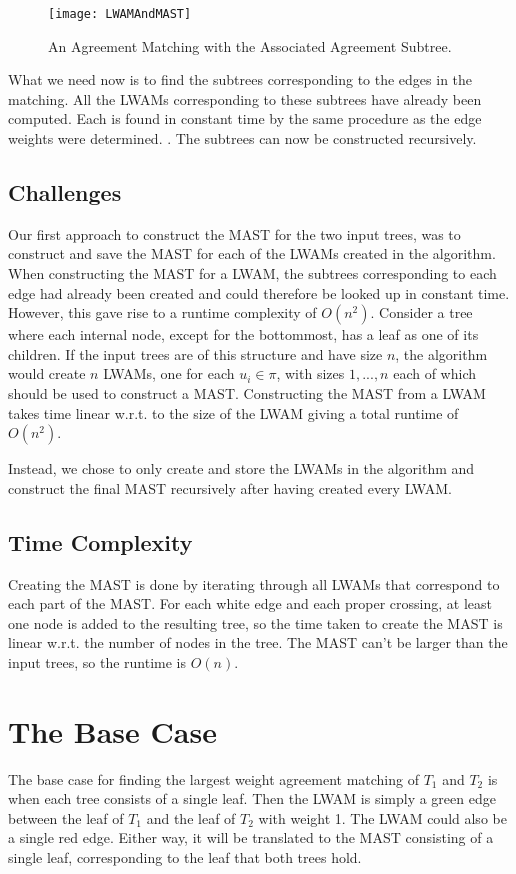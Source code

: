 \begin{figure}
	\texttt{[image: LWAMAndMAST]}
	\caption{An Agreement Matching with the Associated Agreement Subtree. \cite{nlogn}}
	\label{lwam_mast_figure}
\end{figure}

What we need now is to find the subtrees corresponding to the edges in the matching. All the LWAMs corresponding to these subtrees have already been computed. Each is found in constant time by the same procedure as the edge weights were determined.  . The subtrees can now be constructed recursively.

\subsection{Challenges} 
Our first approach to construct the MAST for the two input trees, was to construct and save the MAST for each of the LWAMs created in the algorithm. When constructing the MAST for a LWAM, the subtrees corresponding to each edge had already been created and could therefore be looked up in constant time. However, this gave rise to a runtime complexity of $O(n^2)$. Consider a tree where each internal node, except for the bottommost, has a leaf as one of its children. If the input trees are of this structure and have size $n$, the algorithm would create $n$ LWAMs, one for each $u_i \in \pi$, with sizes $1, ..., n$ each of which should be used to construct a MAST. Constructing the MAST from a LWAM takes time linear w.r.t. to the size of the LWAM giving a total runtime of $O(n^2)$.

Instead, we chose to only create and store the LWAMs in the algorithm and construct the final MAST recursively after having created every LWAM.

\subsection{Time Complexity}
Creating the MAST is done by iterating through all LWAMs that correspond to each part of the MAST. For each white edge and each proper crossing, at least one node is added to the resulting tree, so the time taken to create the MAST is linear w.r.t. the number of nodes in the tree. The MAST can't be larger than the input trees, so the runtime is $O(n)$.

\section{The Base Case}
The base case for finding the largest weight agreement matching of $T_1$ and $T_2$ is when each tree consists of a single leaf. Then the LWAM is simply a green edge between the leaf of $T_1$ and the leaf of $T_2$ with weight 1. The LWAM could also be a single red edge. Either way, it will be translated to the MAST consisting of a single leaf, corresponding to the leaf that both trees hold.


